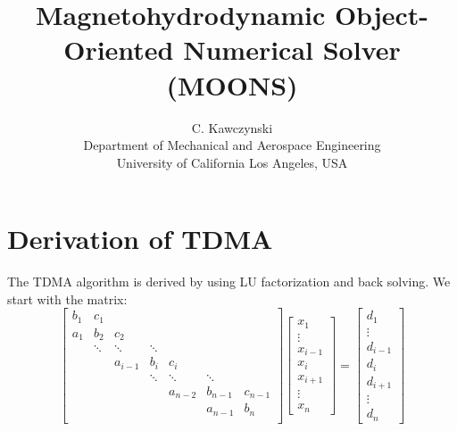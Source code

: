 \documentclass[landscape]{article}
\begin{document}
\doublespacing
\title{Magnetohydrodynamic Object-Oriented Numerical Solver (MOONS)}
\author{C. Kawczynski \\
Department of Mechanical and Aerospace Engineering \\
University of California Los Angeles, USA\\
}
\maketitle
\section{Derivation of TDMA}
The TDMA algorithm is derived by using LU factorization and back solving. We start with the matrix:
\[
\left[
\begin{array}{ccccccccc}
b_{1} & c_{1}    &           &           &           &           &         \\
a_{1} & b_{2}    & c_{2}     &           &           &           &         \\
      & \ddots   & \ddots    & \ddots    &           &           &         \\
      &          & a_{i-1}   & b_{i}     & c_{i}     &           &         \\
      &          &           & \ddots    & \ddots    & \ddots    &         \\
      &          &           &           & a_{n-2}   & b_{n-1}   & c_{n-1} \\
      &          &           &           &           & a_{n-1}   & b_{n}   \\
\end{array} \right] 
\left[ \begin{array}{c}
x_{1} \\ \vdots \\ x_{i-1} \\ x_{i} \\ x_{i+1} \\ \vdots \\ x_{n}
\end{array} \right]
=
\left[ \begin{array}{c}
d_{1} \\ \vdots \\ d_{i-1} \\ d_{i} \\ d_{i+1} \\ \vdots \\ d_{n}
\end{array} \right]
\]
\end{document}
